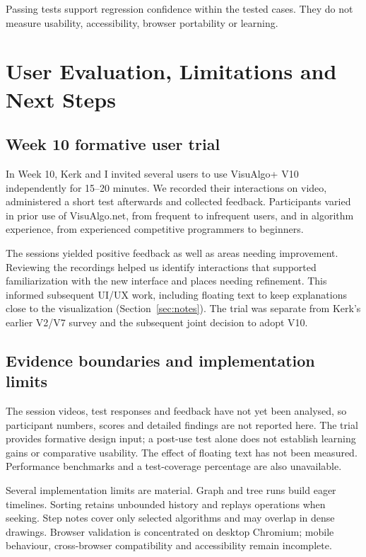 \documentclass[11pt,a4paper]{article}
\newcommand{\page}{\par\vspace{8pt}}
\begin{document}
Passing tests support regression confidence within the tested cases. They do not measure usability, accessibility, browser portability or learning.

\page
\section{User Evaluation, Limitations and Next Steps}
\subsection{Week 10 formative user trial}
In Week 10, Kerk and I invited several users to use VisuAlgo+ V10 independently for 15--20 minutes. We recorded their interactions on video, administered a short test afterwards and collected feedback. Participants varied in prior use of VisuAlgo.net, from frequent to infrequent users, and in algorithm experience, from experienced competitive programmers to beginners.

The sessions yielded positive feedback as well as areas needing improvement. Reviewing the recordings helped us identify interactions that supported familiarization with the new interface and places needing refinement. This informed subsequent UI/UX work, including floating text to keep explanations close to the visualization (Section~\ref{sec:notes}). The trial was separate from Kerk's earlier V2/V7 survey and the subsequent joint decision to adopt V10.

\subsection{Evidence boundaries and implementation limits}
The session videos, test responses and feedback have not yet been analysed, so participant numbers, scores and detailed findings are not reported here. The trial provides formative design input; a post-use test alone does not establish learning gains or comparative usability. The effect of floating text has not been measured. Performance benchmarks and a test-coverage percentage are also unavailable.

Several implementation limits are material. Graph and tree runs build eager timelines. Sorting retains unbounded history and replays operations when seeking. Step notes cover only selected algorithms and may overlap in dense drawings. Browser validation is concentrated on desktop Chromium; mobile behaviour, cross-browser compatibility and accessibility remain incomplete.
\end{document}

